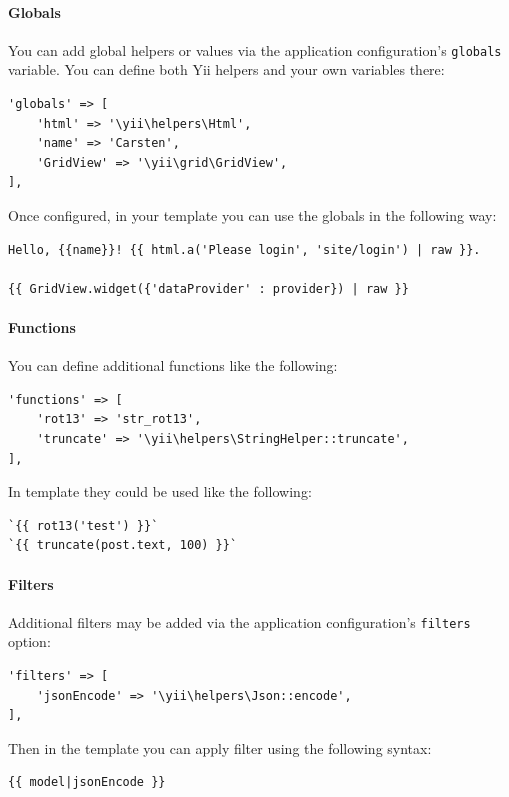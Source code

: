 \paragraph{Globals}
You can add global helpers or values via the application configuration's \lstinline|globals| variable. You can define both Yii
helpers and your own variables there:

\lstset{language=php}\begin{lstlisting}
'globals' => [
    'html' => '\yii\helpers\Html',
    'name' => 'Carsten',
    'GridView' => '\yii\grid\GridView',
],
\end{lstlisting}
Once configured, in your template you can use the globals in the following way:

\begin{lstlisting}
Hello, {{name}}! {{ html.a('Please login', 'site/login') | raw }}.

{{ GridView.widget({'dataProvider' : provider}) | raw }}
\end{lstlisting}
\paragraph{Functions}
You can define additional functions like the following:

\lstset{language=php}\begin{lstlisting}
'functions' => [
    'rot13' => 'str_rot13',
    'truncate' => '\yii\helpers\StringHelper::truncate',
],
\end{lstlisting}
In template they could be used like the following:

\begin{lstlisting}
`{{ rot13('test') }}`
`{{ truncate(post.text, 100) }}`
\end{lstlisting}
\paragraph{Filters}
Additional filters may be added via the application configuration's \lstinline|filters| option:

\lstset{language=php}\begin{lstlisting}
'filters' => [
    'jsonEncode' => '\yii\helpers\Json::encode',
],
\end{lstlisting}
Then in the template you can apply filter using the following syntax:

\begin{lstlisting}
{{ model|jsonEncode }}
\end{lstlisting}
